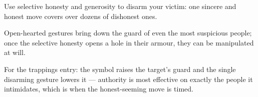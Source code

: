 

\begin{distilled}
  \item Use selective honesty and generosity to disarm your victim: one sincere and honest move covers over dozens of dishonest ones.
  \item Open-hearted gestures bring down the guard of even the most suspicious people; once the selective honesty opens a hole in their armour, they can be manipulated at will.
  \item For the trappings entry: the symbol raises the target's guard and the single disarming gesture lowers it --- authority is most effective on exactly the people it intimidates, which is when the honest-seeming move is timed.
\end{distilled}

